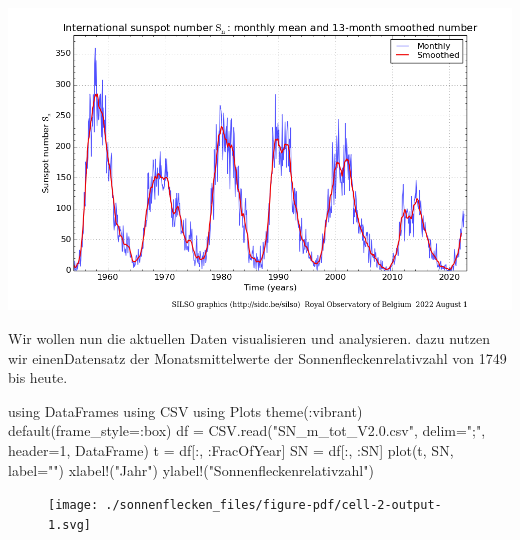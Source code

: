 \documentclass[
  a4paper,
  DIV=11]{scrreprt}
\newenvironment{Shaded}{\begin{snugshade}}{\end{snugshade}}
\newcommand{\BuiltInTok}[1]{\textcolor[rgb]{0.00,0.23,0.31}{#1}}
\newcommand{\FloatTok}[1]{\textcolor[rgb]{0.68,0.00,0.00}{#1}}
\newcommand{\FunctionTok}[1]{\textcolor[rgb]{0.28,0.35,0.67}{#1}}
\newcommand{\ImportTok}[1]{\textcolor[rgb]{0.00,0.46,0.62}{#1}}
\newcommand{\NormalTok}[1]{\textcolor[rgb]{0.00,0.23,0.31}{#1}}
\newcommand{\OperatorTok}[1]{\textcolor[rgb]{0.37,0.37,0.37}{#1}}
\newcommand{\StringTok}[1]{\textcolor[rgb]{0.13,0.47,0.30}{#1}}
\begin{document}
\includegraphics{./images/paste-DE59FE1D.png}

Wir wollen nun die aktuellen Daten visualisieren und analysieren. dazu
nutzen wir einenDatensatz der Monatsmittelwerte der
Sonnenfleckenrelativzahl von 1749 bis heute.

\begin{Shaded}
\begin{Highlighting}[]
\ImportTok{using} \BuiltInTok{DataFrames}
\ImportTok{using} \BuiltInTok{CSV}
\ImportTok{using} \BuiltInTok{Plots}
\FunctionTok{theme}\NormalTok{(}\OperatorTok{:}\NormalTok{vibrant)}
\FunctionTok{default}\NormalTok{(frame\_style}\OperatorTok{=:}\NormalTok{box)}
\NormalTok{df }\OperatorTok{=}\NormalTok{ CSV.}\FunctionTok{read}\NormalTok{(}\StringTok{"SN\_m\_tot\_V2.0.csv"}\NormalTok{, delim}\OperatorTok{=}\StringTok{";"}\NormalTok{, header}\OperatorTok{=}\FloatTok{1}\NormalTok{,  DataFrame)}
\NormalTok{t }\OperatorTok{=}\NormalTok{ df[}\OperatorTok{:}\NormalTok{, }\OperatorTok{:}\NormalTok{FracOfYear]}
\NormalTok{SN }\OperatorTok{=}\NormalTok{ df[}\OperatorTok{:}\NormalTok{, }\OperatorTok{:}\NormalTok{SN]}
\FunctionTok{plot}\NormalTok{(t, SN, label}\OperatorTok{=}\StringTok{""}\NormalTok{)}
\FunctionTok{xlabel!}\NormalTok{(}\StringTok{"Jahr"}\NormalTok{)}
\FunctionTok{ylabel!}\NormalTok{(}\StringTok{"Sonnenfleckenrelativzahl"}\NormalTok{)}
\end{Highlighting}
\end{Shaded}

\begin{figure}[H]

{\centering \texttt{[image: ./sonnenflecken\_files/figure-pdf/cell-2-output-1.svg]}

}

\end{figure}
\end{document}
